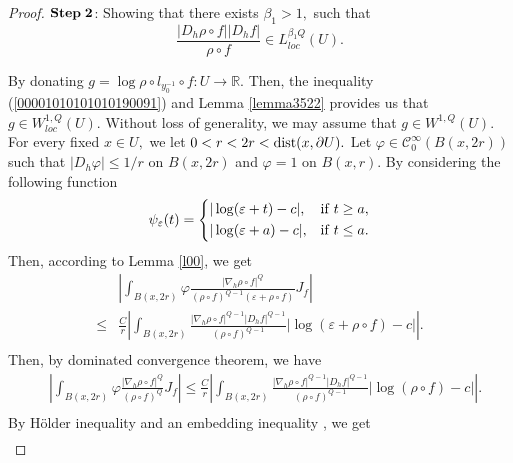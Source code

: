 \documentclass[11pt,twoside]{article}
\theoremstyle{definition}
\theoremstyle{remark}
\newcommand{\abs}[1]{\left|#1\right|}
\begin{document}
\begin{proof}
${\rm \mathbf{Step}\;\mathbf{2}}$: Showing that there exists $\beta_{1}>1,$ such that $$\frac{\vert D_{h}\rho\circ f\vert\vert D_{h}f\vert}{\rho\circ f}\in L_{loc}^{\beta_{1} Q}(U).$$



By donating $g=\log\rho\circ l_{y_{0}^{-1}}\circ f:U\rightarrow\mathbb{R}.$ Then, the inequality (\ref{00001010101010190091}) and Lemma \ref{lemma3522} provides us that $g\in W_{loc}^{1,Q}(U).$ Without loss of generality, we may assume that $g\in W^{1,Q}(U).$ For every fixed $x\in U,$ we let $0<r<2r<{\rm dist}(x,\partial U).$ Let $\varphi\in \mathcal{C}_{0}^{\infty}(B(x,2r))$ such that $\vert D_{h}\varphi \vert\leq1/r$ on $B(x,2r)$ and $\varphi=1$ on $B(x,r).$
By considering the following function
\begin{equation}
  \psi_{\varepsilon}(t)=\left\{
\begin{aligned}
&\vert\log(\varepsilon+t)-c\vert,      &   &    {\rm if}\;{t\geq a},\\
&\vert\log(\varepsilon+a)-c\vert,       &      &{\rm if}\; {t\leq a.}
\end{aligned} \right.
\end{equation}
Then, according to Lemma \ref{l00}, we get
\begin{equation}
\begin{aligned}
&\abs{\int_{B(x,2r)}\varphi\frac{\vert\nabla_{h}\rho\circ f\vert^{Q}}{(\rho\circ f)^{Q-1}(\varepsilon+\rho\circ f)}J_{f}}\\
\leq& 
\frac{C}{r}\abs{\int_{B(x,2r)}\frac{\vert\nabla_{h}\rho\circ f\vert^{Q-1}\vert D_{h}f\vert^{Q-1}}{(\rho\circ f)^{Q-1}} \vert\log(\varepsilon+\rho\circ f)-c\vert}.\\
\end{aligned}
\end{equation}
Then, by dominated convergence theorem, we have
\begin{equation}
\begin{aligned}
&\abs{\int_{B(x,2r)}\varphi\frac{\vert\nabla_{h}\rho\circ f\vert^{Q}}{(\rho\circ f)^{Q}}J_{f}}\leq\frac{C}{r}\abs{\int_{B(x,2r)}\frac{\vert\nabla_{h}\rho\circ f\vert^{Q-1}\vert D_{h}f\vert^{Q-1}}{(\rho\circ f)^{Q-1}} \vert\log(\rho\circ f)-c\vert}.\\
\end{aligned}
\end{equation}
By H\"{o}lder inequality and an embedding inequality \cite[Theorem 3.2]{VI07}, we get 
\begin{equation}
\begin{aligned}

\end{aligned}
\end{equation}
\end{proof}
\end{document}
